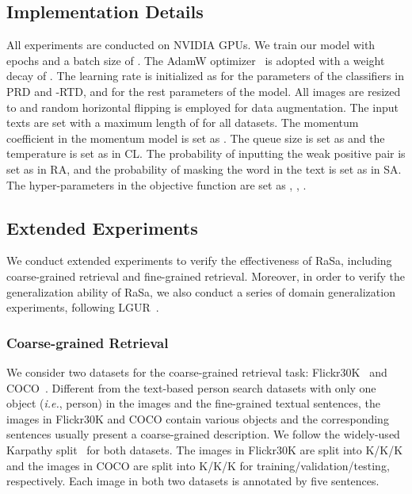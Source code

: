 \documentclass{article}
\begin{document}
\subsection{Implementation Details}
\label{Implementation Details}
All experiments are conducted on  NVIDIA  GPUs.
We train our model with  epochs and a batch size of . 
The AdamW optimizer~\cite{loshchilov2018decoupled} is adopted with a weight decay of . 
The learning rate is initialized as  for the parameters of the classifiers in PRD and -RTD, and  for the rest parameters of the model.
All images are resized to  and random horizontal flipping is employed for data augmentation.
The input texts are set with a maximum length of  for all datasets.
The momentum coefficient in the momentum model is set as .
The queue size  is set as  and the temperature  is set as  in CL.
The probability of inputting the weak positive pair is set as  in RA, and the probability of masking the word in the text is set as  in SA.
The hyper-parameters in the objective function are set as , , .  

\subsection{Extended Experiments}
\label{Extended Experiments}
We conduct extended experiments to verify the effectiveness of RaSa, including coarse-grained retrieval and fine-grained retrieval. 
Moreover, in order to verify the generalization ability of RaSa, we also conduct a series of domain generalization experiments, following LGUR~\cite{shao2022learning}.


\subsubsection{Coarse-grained Retrieval}
We consider two datasets for the coarse-grained retrieval task: Flickr30K~\cite{plummer2015flickr30k} and COCO~\cite{lin2014microsoft}.
Different from the text-based person search datasets with only one object (\emph{i.e.}, person) in the images and the fine-grained textual sentences, the images in Flickr30K and COCO contain various objects and the corresponding sentences usually present a coarse-grained description.
We follow the widely-used Karpathy split~\cite{karpathy2015deep} for both datasets.
The images in Flickr30K are split into K/K/K and the images in COCO are split into K/K/K for training/validation/testing, respectively.
Each image in both two datasets is annotated by five sentences.
\end{document}
